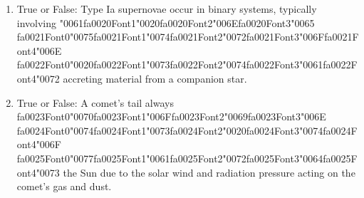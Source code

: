 \documentclass[12pt]{article}
\begin{document}
\begin{enumerate}[label=\arabic*.]
\item True or False: Type Ia supernovae occur in binary systems, typically involving {\char"0061}{\csname fa0020Font1\endcsname\char"0020}{\csname fa0020Font2\endcsname\char"006E}{\csname fa0020Font3\endcsname\char"0065} {\csname fa0021Font0\endcsname\char"0075}{\csname fa0021Font1\endcsname\char"0074}{\csname fa0021Font2\endcsname\char"0072}{\csname fa0021Font3\endcsname\char"006F}{\csname fa0021Font4\endcsname\char"006E} {\csname fa0022Font0\endcsname\char"0020}{\csname fa0022Font1\endcsname\char"0073}{\csname fa0022Font2\endcsname\char"0074}{\csname fa0022Font3\endcsname\char"0061}{\csname fa0022Font4\endcsname\char"0072} accreting material from a companion star.
\item True or False: A comet's tail always {\csname fa0023Font0\endcsname\char"0070}{\csname fa0023Font1\endcsname\char"006F}{\csname fa0023Font2\endcsname\char"0069}{\csname fa0023Font3\endcsname\char"006E} {\csname fa0024Font0\endcsname\char"0074}{\csname fa0024Font1\endcsname\char"0073}{\csname fa0024Font2\endcsname\char"0020}{\csname fa0024Font3\endcsname\char"0074}{\csname fa0024Font4\endcsname\char"006F} {\csname fa0025Font0\endcsname\char"0077}{\csname fa0025Font1\endcsname\char"0061}{\csname fa0025Font2\endcsname\char"0072}{\csname fa0025Font3\endcsname\char"0064}{\csname fa0025Font4\endcsname\char"0073} the Sun due to the solar wind and radiation pressure acting on the comet's gas and dust.
\end{enumerate}
\end{document}
